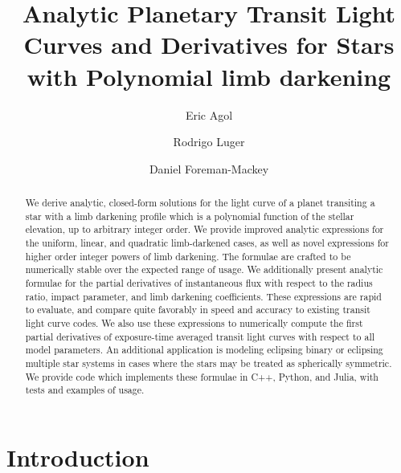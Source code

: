 \documentclass[modern]{aastex61}
\begin{document}

\setlength{\abovedisplayskip}{1.5em}
\setlength{\belowdisplayskip}{1.5em}

\title{%
Analytic Planetary Transit Light Curves and Derivatives for Stars with Polynomial limb darkening
}


\author[0000-0002-0802-9145]{Eric Agol}
\author[0000-0002-0296-3826]{Rodrigo Luger}
\author[0000-0002-9328-5652]{Daniel Foreman-Mackey}


\begin{abstract}
 We derive analytic, closed-form solutions for the light curve of a planet
 transiting a star with a limb darkening profile which is a polynomial function
 of the stellar elevation, up to arbitrary integer order. 
 We provide improved analytic expressions for the uniform, linear, and quadratic
 limb-darkened cases, as well as novel expressions for higher order integer powers 
 of limb darkening.  The formulae are crafted to be numerically stable over the 
 expected range of usage.  We additionally present analytic formulae for
 the partial derivatives of instantaneous flux with respect to the radius ratio,
 impact parameter, and limb darkening coefficients.  These expressions are rapid to
 evaluate, and compare quite favorably in speed and accuracy to existing transit light
 curve codes. We also use these expressions to numerically compute the first partial 
 derivatives of exposure-time averaged transit light curves with respect to all 
 model parameters.  An additional application is modeling eclipsing binary or
 eclipsing multiple star systems in cases where the stars may be treated as spherically 
 symmetric.  We provide code which implements these formulae in C++, Python, and Julia, 
 with tests and examples of usage.
\end{abstract}

%
\section{Introduction}
\label{sec:intro}
\end{document}
